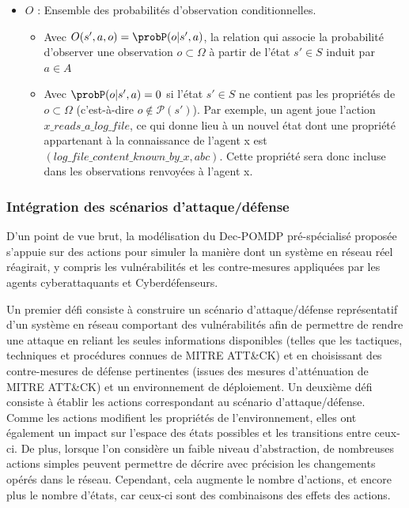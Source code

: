 \begin{itemize}
  \item $O$ : Ensemble des probabilités d'observation conditionnelles.
        \begin{itemize}
          \item Avec $O(s',a,o) = \probP(o|s',a)$, la relation qui associe la probabilité d'observer une observation $o \subset \Omega$ à partir de l'état $s' \in S$ induit par $a \in A$
          \item Avec $\probP(o|s',a) = 0$ si l'état $s' \in S$ ne contient pas les propriétés de $o \subset \Omega$ (c'est-à-dire $o \not\in \mathcal{P}(s')$). Par exemple, un agent joue l'action $x\_reads\_a\_log\_file$, ce qui donne lieu à un nouvel état dont une propriété appartenant à la connaissance de l'agent x est $(log\_file\_content\_known\_by\_x, \allowbreak abc)$. Cette propriété sera donc incluse dans les observations renvoyées à l'agent x.
        \end{itemize}

\end{itemize}


\subsubsection{Intégration des scénarios d'attaque/défense}

\noindent
D'un point de vue brut, la modélisation du Dec-POMDP pré-spécialisé proposée s'appuie sur des actions pour simuler la manière dont un système en réseau réel réagirait, y compris les vulnérabilités et les contre-mesures appliquées par les agents cyberattaquants et Cyberdéfenseurs.

Un premier défi consiste à construire un scénario d'attaque/défense représentatif d'un système en réseau comportant des vulnérabilités afin de permettre de rendre une attaque en reliant les seules informations disponibles (telles que les tactiques, techniques et procédures connues de MITRE ATT\&CK) et en choisissant des contre-mesures de défense pertinentes (issues des mesures d'atténuation de MITRE ATT\&CK) et un environnement de déploiement. Un deuxième défi consiste à établir les actions correspondant au scénario d'attaque/défense. Comme les actions modifient les propriétés de l'environnement, elles ont également un impact sur l'espace des états possibles et les transitions entre ceux-ci.
De plus, lorsque l'on considère un faible niveau d'abstraction, de nombreuses actions simples peuvent permettre de décrire avec précision les changements opérés dans le réseau. Cependant, cela augmente le nombre d'actions, et encore plus le nombre d'états, car ceux-ci sont des combinaisons des effets des actions.

